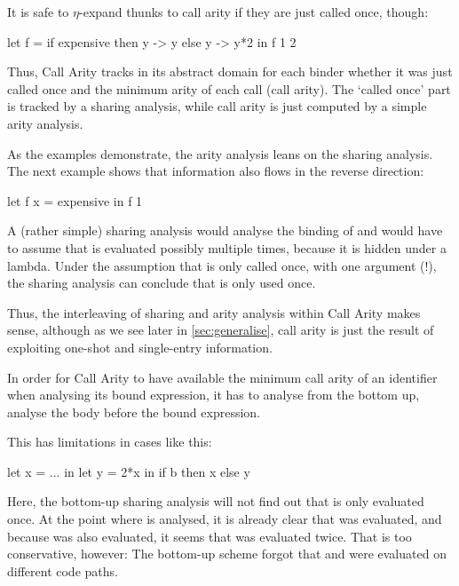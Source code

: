 It is safe to $\eta$-expand thunks to call arity if they are just called once, though:
\begin{haskellcode}
  let f =
        if expensive
        then \x y -> y
        else \x y -> y*2
  in f 1 2
\end{haskellcode}

Thus, Call Arity tracks in its abstract domain for each binder whether it was just called once and the minimum arity of each call (call arity).
The `called once' part is tracked by a sharing analysis, while call arity is just computed by a simple arity analysis.

As the examples demonstrate, the arity analysis leans on the sharing analysis.
The next example shows that information also flows in the reverse direction:
\begin{haskellcode}
  let f x = expensive
  in f 1
\end{haskellcode}

A (rather simple) sharing analysis would analyse the binding of  and would have to assume that  is evaluated possibly multiple times, because it is hidden under a lambda.
Under the assumption that  is only called once, with one argument (!), the sharing analysis can conclude that  is only used once.

Thus, the interleaving of sharing and arity analysis within Call Arity makes sense, although as we see later in \cref{sec:generalise}, call arity is just the result of exploiting one-shot and single-entry information.\smallskip

In order for Call Arity to have available the minimum call arity of an identifier when analysing its bound expression, it has to analyse  from the bottom up, \eg analyse the body before the bound expression.

This has limitations in cases like this:
\begin{haskellcode}
  let x = ...
  in let y = 2*x
     in if b
        then x
        else y
\end{haskellcode}

Here, the bottom-up sharing analysis will not find out that  is only evaluated once. 
At the point where  is analysed, it is already clear that  was evaluated, and because  was also evaluated, it seems that  was evaluated twice.
That is too conservative, however: The bottom-up scheme forgot that  and  were evaluated on different code paths.


